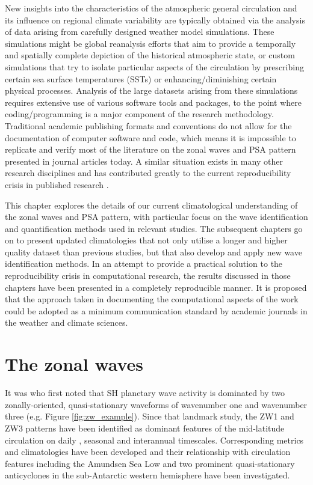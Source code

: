 New insights into the characteristics of the atmospheric general circulation and its influence on regional climate variability are typically obtained via the analysis of data arising from carefully designed weather model simulations. These simulations might be global reanalysis efforts that aim to provide a temporally and spatially complete depiction of the historical atmospheric state, or custom simulations that try to isolate particular aspects of the circulation by prescribing certain sea surface temperatures (SSTs) or enhancing/diminishing certain physical processes. Analysis of the large datasets arising from these simulations requires extensive use of various software tools and packages, to the point where coding/programming is a major component of the research methodology. Traditional academic publishing formats and conventions do not allow for the documentation of computer software and code, which means it is impossible to replicate and verify most of the literature on the zonal waves and PSA pattern presented in journal articles today. A similar situation exists in many other research disciplines and has contributed greatly to the current reproducibility crisis in published research \citep[e.g.][]{Peng2011}.

This chapter explores the details of our current climatological understanding of the zonal waves and PSA pattern, with particular focus on the wave identification and quantification methods used in relevant studies. The subsequent chapters go on to present updated climatologies that not only utilise a longer and higher quality dataset than previous studies, but that also develop and apply new wave identification methods. In an attempt to provide a practical solution to the reproducibility crisis in computational research, the results discussed in those chapters have been presented in a completely reproducible manner. It is proposed that the approach taken in documenting the computational aspects of the work could be adopted as a minimum communication standard by academic journals in the weather and climate sciences.


\section{The zonal waves}\label{s:zw_overview}

It was \citet{vanLoon1972} who first noted that SH planetary wave activity is dominated by two zonally-oriented, quasi-stationary waveforms of wavenumber one and wavenumber three (e.g. Figure \ref{fig:zw_example}). Since that landmark study, the ZW1 and ZW3 patterns have been identified as dominant features of the mid-latitude circulation on daily \citep[e.g.][]{Kidson1988}, seasonal \citep[e.g.][]{Mo1985} and interannual \citep[e.g.][]{Karoly1989} timescales. Corresponding metrics and climatologies have been developed \citep{Raphael2004,Hobbs2007} and their relationship with circulation features including the Amundsen Sea Low \citep[ASL;][]{Turner2013} and two prominent quasi-stationary anticyclones in the sub-Antarctic western hemisphere \citep{Hobbs2010} have been investigated.

